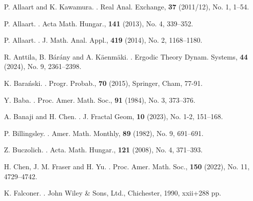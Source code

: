 \documentclass{amsart}
\theoremstyle{definition}
\theoremstyle{remark}
\numberwithin{equation}{section}
\begin{document}

\begin{thebibliography}{11}


P. Allaart and K. Kawamura.
.
\newblock  Real Anal. Exchange, {\bf  37} (2011/12), No. 1, 1--54.

P. Allaart.
.
\newblock  Acta Math. Hungar., {\bf  141} (2013), No. 4, 339--352.





P. Allaart.
.
\newblock  J. Math. Anal. Appl., {\bf  419} (2014), No. 2, 1168–1180.


R. Anttila, B. Bárány and A. Käenmäki.
.
\newblock  Ergodic Theory Dynam. Systems, {\bf  44} (2024), No. 9, 2361--2398.


K. Barański.
.
\newblock  Progr. Probab., {\bf  70} (2015), Springer, Cham, 77-91.




Y. Baba.
.
\newblock  Proc. Amer. Math. Soc., {\bf 91} (1984), No. 3, 373--376.

A. Banaji and H. Chen.
.
\newblock  J. Fractal Geom, {\bf 10} (2023), No. 1-2, 151--168.



P. Billingsley.
.
\newblock  Amer. Math. Monthly, {\bf  89} (1982), No. 9, 691--691.

Z. Buczolich.
.
\newblock  Acta. Math. Hungar., {\bf 121} (2008), No. 4, 371--393.

H. Chen, J. M. Fraser and H. Yu.
.
\newblock  Proc. Amer. Math. Soc., {\bf 150} (2022), No. 11, 4729--4742.

K. Falconer.
. 
\newblock John Wiley \& Sons, Ltd., Chichester, 1990, xxii+288 pp.


\end{thebibliography}
\end{document}
